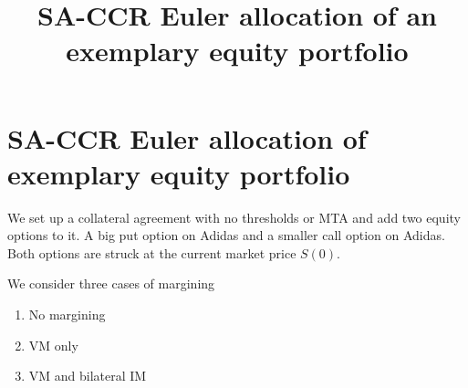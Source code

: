 \documentclass[11pt]{article}
\title{SA-CCR Euler allocation of an exemplary equity portfolio}
\providecommand{\tightlist}{%
      \setlength{\itemsep}{0pt}\setlength{\parskip}{0pt}}
\begin{document}
    
    \maketitle
    
    

    
    \hypertarget{sa-ccr-euler-allocation-of-exemplary-equity-portfolio}{%
\section{SA-CCR Euler allocation of exemplary equity
portfolio}\label{sa-ccr-euler-allocation-of-exemplary-equity-portfolio}}

We set up a collateral agreement with no thresholds or MTA and add two
equity options to it. A big put option on Adidas and a smaller call
option on Adidas. Both options are struck at the current market price
\(S(0)\).

We consider three cases of margining

\begin{enumerate}
\def\labelenumi{\arabic{enumi}.}
\tightlist
\item
  No margining
\item
  VM only
\item
  VM and bilateral IM
\end{enumerate}
\end{document}
